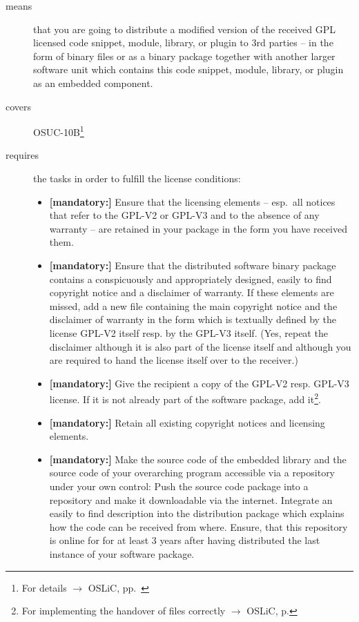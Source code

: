 \begin{description}
\item[means] that you are going to distribute a modified version of the received
GPL licensed code snippet, module, library, or plugin to 3rd parties -- in the
form of binary files or as a binary package together with another larger
software unit which contains this code snippet, module, library, or plugin as an
embedded component.
\item[covers] OSUC-10B\footnote{For details $\rightarrow$ OSLiC, pp.\
\pageref{OSUC-10B-DEF}}
\item[requires] the tasks in order to fulfill the license conditions:
\begin{itemize}

  \item \textbf{[mandatory:]} Ensure that the licensing elements -- esp.\ all
  notices that refer to the GPL-V2 or GPL-V3 and to the absence of any
  warranty -- are retained in your package in the form you have received them.

  \item \textbf{[mandatory:]} Ensure that the distributed software binary
  package contains a conspicuously and appropriately designed, easily to find
  copyright notice and a disclaimer of warranty. If these elements are missed,
  add a new file containing the main copyright notice and the disclaimer of
  warranty in the form which is textually defined by the license GPL-V2 itself
  resp. by the GPL-V3 itself. (Yes, repeat the disclaimer although it is also
  part of the license itself and although you are required to hand the license
  itself over to the receiver.)
  
  \item \textbf{[mandatory:]} Give the recipient a copy of the GPL-V2 resp.
  GPL-V3 license. If it is not already part of the software package, add
  it\footnote{For implementing the handover of files correctly $\rightarrow$
  OSLiC, p. \pageref{DistributingFilesHint}}.
  
  \item \textbf{[mandatory:]} Retain all existing copyright notices and
  licensing elements.

  \item \textbf{[mandatory:]} Make the source code of the embedded library and
  the source code of your overarching program accessible via a repository under
  your own control: Push the source code package into a repository and make it
  downloadable via the internet. Integrate an easily to find description into
  the distribution package which explains how the code can be received from
  where. Ensure, that this repository is online for for at least 3 years after
  having distributed the last instance of your software package.


\end{itemize}
\end{description}

